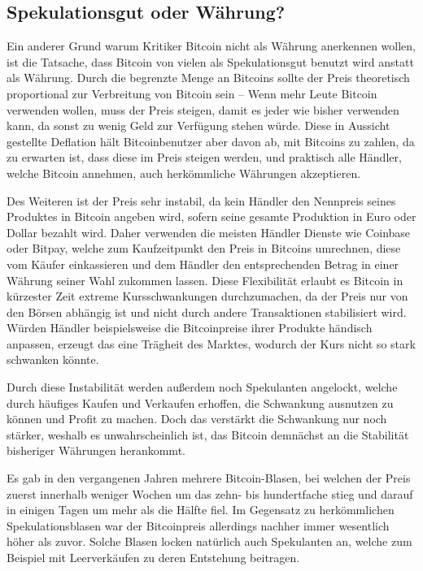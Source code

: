 \subsection{Spekulationsgut oder Währung?}
\label{sec:speculation}

Ein anderer Grund warum Kritiker Bitcoin nicht als Währung anerkennen wollen, ist die Tatsache, dass Bitcoin von vielen als Spekulationsgut benutzt wird anstatt als Währung.
Durch die begrenzte Menge an Bitcoins sollte der Preis theoretisch proportional zur Verbreitung von Bitcoin sein -- Wenn mehr Leute Bitcoin verwenden wollen, muss der Preis steigen, damit es jeder wie bisher verwenden kann, da sonst zu wenig Geld zur Verfügung stehen würde.
Diese in Aussicht gestellte Deflation hält Bitcoinbenutzer aber davon ab, mit Bitcoins zu zahlen, da zu erwarten ist, dass diese im Preis steigen werden, und praktisch alle Händler, welche Bitcoin annehmen, auch herkömmliche Währungen akzeptieren.

Des Weiteren ist der Preis sehr instabil, da kein Händler den Nennpreis seines Produktes in Bitcoin angeben wird, sofern seine gesamte Produktion in Euro oder Dollar bezahlt wird.
Daher verwenden die meisten Händler Dienste wie Coinbase oder Bitpay, welche zum Kaufzeitpunkt den Preis in Bitcoins umrechnen, diese vom Käufer einkassieren und dem Händler den entsprechenden Betrag in einer Währung seiner Wahl zukommen lassen.
Diese Flexibilität erlaubt es Bitcoin in kürzester Zeit extreme Kursschwankungen durchzumachen, da der Preis nur von den Börsen abhängig ist und nicht durch andere Transaktionen stabilisiert wird.
Würden Händler beispielsweise die Bitcoinpreise ihrer Produkte händisch anpassen, erzeugt das eine Trägheit des Marktes, wodurch der Kurs nicht so stark schwanken könnte.

Durch diese Instabilität werden außerdem noch Spekulanten angelockt, welche durch häufiges Kaufen und Verkaufen erhoffen, die Schwankung ausnutzen zu können und Profit zu machen.
Doch das verstärkt die Schwankung nur noch stärker, weshalb es unwahrscheinlich ist, das Bitcoin demnächst an die Stabilität bisheriger Währungen herankommt.

Es gab in den vergangenen Jahren mehrere Bitcoin-Blasen, bei welchen der Preis zuerst innerhalb weniger Wochen um das zehn- bis hundertfache stieg und darauf in einigen Tagen um mehr als die Hälfte fiel.
Im Gegensatz zu herkömmlichen Spekulationsblasen war der Bitcoinpreis allerdings nachher immer wesentlich höher als zuvor.
Solche Blasen locken natürlich auch Spekulanten an, welche zum Beispiel mit Leerverkäufen zu deren Entstehung beitragen.
